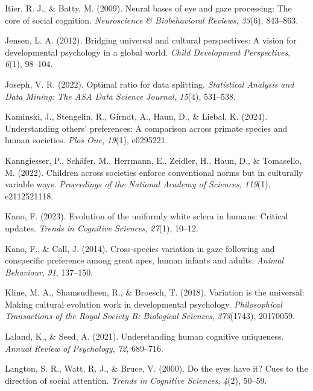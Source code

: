 \documentclass[
  man,floatsintext]{apa7}
\newlength{\cslhangindent}
\newenvironment{CSLReferences}[2] %
 {\begin{list}{}{%
  \setlength{\itemindent}{0pt}
  \setlength{\leftmargin}{0pt}
  \setlength{\parsep}{0pt}
  \ifodd #1
   \setlength{\leftmargin}{\cslhangindent}
   \setlength{\itemindent}{-1\cslhangindent}
  \fi
  \setlength{\itemsep}{#2\baselineskip}}}
 {\end{list}}
\begin{document}
\begin{CSLReferences}{1}{0}
Itier, R. J., \& Batty, M. (2009). Neural bases of eye and gaze processing: The core of social cognition. \emph{Neuroscience \& Biobehavioral Reviews}, \emph{33}(6), 843--863.

Jensen, L. A. (2012). Bridging universal and cultural perspectives: A vision for developmental psychology in a global world. \emph{Child Development Perspectives}, \emph{6}(1), 98--104.

Joseph, V. R. (2022). Optimal ratio for data splitting. \emph{Statistical Analysis and Data Mining: The ASA Data Science Journal}, \emph{15}(4), 531--538.

Kaminski, J., Stengelin, R., Girndt, A., Haun, D., \& Liebal, K. (2024). Understanding others' preferences: A comparison across primate species and human societies. \emph{Plos One}, \emph{19}(1), e0295221.

Kanngiesser, P., Schäfer, M., Herrmann, E., Zeidler, H., Haun, D., \& Tomasello, M. (2022). Children across societies enforce conventional norms but in culturally variable ways. \emph{Proceedings of the National Academy of Sciences}, \emph{119}(1), e2112521118.

Kano, F. (2023). Evolution of the uniformly white sclera in humans: Critical updates. \emph{Trends in Cognitive Sciences}, \emph{27}(1), 10--12.

Kano, F., \& Call, J. (2014). Cross-species variation in gaze following and conspecific preference among great apes, human infants and adults. \emph{Animal Behaviour}, \emph{91}, 137--150.

Kline, M. A., Shamsudheen, R., \& Broesch, T. (2018). Variation is the universal: Making cultural evolution work in developmental psychology. \emph{Philosophical Transactions of the Royal Society B: Biological Sciences}, \emph{373}(1743), 20170059.

Laland, K., \& Seed, A. (2021). Understanding human cognitive uniqueness. \emph{Annual Review of Psychology}, \emph{72}, 689--716.

Langton, S. R., Watt, R. J., \& Bruce, V. (2000). Do the eyes have it? Cues to the direction of social attention. \emph{Trends in Cognitive Sciences}, \emph{4}(2), 50--59.


\end{CSLReferences}
\end{document}
